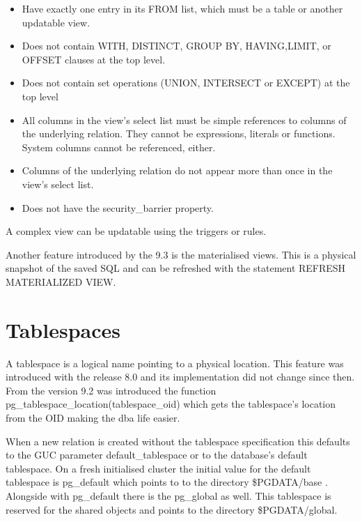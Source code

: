 \begin{itemize}


 \item   Have exactly one entry in its FROM list, which must be a table or another updatable view.

 \item Does not contain WITH, DISTINCT, GROUP BY, HAVING,LIMIT, or OFFSET clauses at the top level.

 \item  Does not contain set operations (UNION, INTERSECT or EXCEPT) at the top level
 
 \item   All columns in the view's select list must be simple references to columns of the
underlying relation. They cannot be expressions, literals or functions. System columns cannot be
referenced, either.

 \item   Columns of the underlying relation do not appear more than once in the view's select list.

 \item   Does not have the security\_barrier property.

\end{itemize}

A complex view can be updatable using the triggers or rules.\newline

Another feature introduced by the 9.3 is the materialised views. This is a physical snapshot of the
saved SQL and can be refreshed with the statement REFRESH MATERIALIZED VIEW.  


\section{Tablespaces}
\label{sub:TBS-LOGICAL}
A tablespace is a logical name pointing to a physical location. 
This feature was introduced with the release 8.0 and its implementation did not change since
then. From the version 9.2 was introduced the function pg\_tablespace\_location(tablespace\_oid)
which gets the tablespace's location from the OID making the dba life easier.

When a new relation is created without the tablespace specification this defaults to the GUC
parameter default\_tablespace or to the database's default tablespace. 
On a fresh initialised cluster the initial value for the default tablespace is pg\_default which
points to to the directory \$PGDATA/base . Alongside with pg\_default there is the pg\_global as
well. This tablespace is reserved for the shared objects and points to the directory
\$PGDATA/global.

